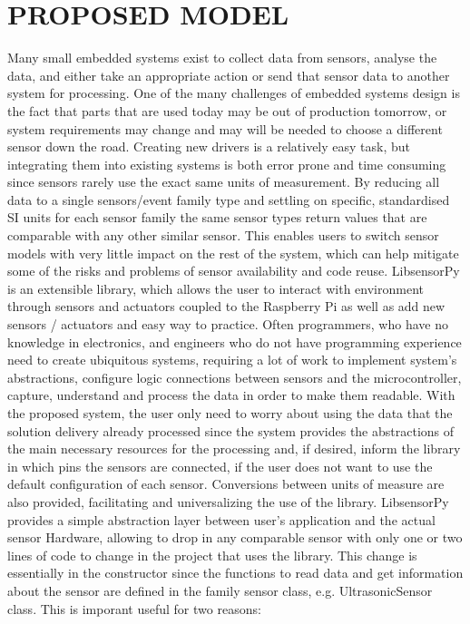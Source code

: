 \documentclass{acm_proc_article-sp}
\begin{document}
\section{PROPOSED MODEL}
Many small embedded systems exist to collect data from sensors, analyse the data, and either take an appropriate action or send that sensor data to another system for processing. One of the many challenges of embedded systems design is the fact that parts that are used today may be out of production tomorrow, or system requirements may change and may will be needed to choose a different sensor down the road.
\newline
\newline
Creating new drivers is a relatively easy task, but integrating them into existing systems is both error prone and time consuming since sensors rarely use the exact same units of measurement. By reducing all data to a single sensors/event family type and settling on specific, standardised SI units for each sensor family the same sensor types return values that are comparable with any other similar sensor. This enables users to switch sensor models with very little impact on the rest of the system, which can help mitigate some of the risks and problems of sensor availability and code reuse.
\newline
\newline
LibsensorPy is an extensible library, which allows the user to interact with environment through sensors and actuators coupled to the Raspberry Pi as well as add new sensors / actuators and easy way to practice. Often programmers, who have no knowledge in electronics, and engineers who do not have programming experience need to create ubiquitous systems, requiring a lot of work to implement system's abstractions, configure logic connections between sensors and the microcontroller, capture, understand and process the data in order to make them readable.
\newline
\newline 
With the proposed system, the user only need to worry about using the data that the solution delivery already processed since the system provides the abstractions of the main necessary resources for the processing and, if desired, inform the library in which pins the sensors are connected, if the user does not want to use the default configuration of each sensor. Conversions between units of measure are also provided, facilitating and universalizing the use of the library.
\newline
\newline 
LibsensorPy provides a simple abstraction layer between user's application and the actual sensor Hardware, allowing to drop in any comparable sensor with only one or two lines of code to change in the project that uses the library. This change is essentially in the constructor since the functions to read data and get information about the sensor are defined in the family sensor class, e.g. UltrasonicSensor class.
\newline
\newline
This is imporant useful for two reasons:
\end{document}
